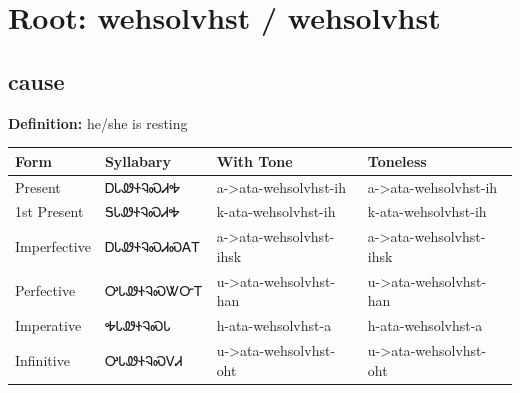 \documentclass{article}%
\begin{document}
%
\normalsize%
\section*{Root: wehsolvhst / wehsolvhst}%
\subsection*{cause}%
\textbf{Definition: }%
he/she is resting%
\\[0.5em]%
\begin{tabular}{|l|l|l|l|}%
\hline%
\textbf{Form}&\textbf{Syllabary}&\textbf{With Tone}&\textbf{Toneless}\\%
\hline%
Present&ᎠᏓᏪᏐᎸᏍᏗᎭ&a{-}>ata{-}wehsolvhst{-}ih&a{-}>ata{-}wehsolvhst{-}ih\\%
1st Present&ᎦᏓᏪᏐᎸᏍᏗᎭ&k{-}ata{-}wehsolvhst{-}ih&k{-}ata{-}wehsolvhst{-}ih\\%
Imperfective&ᎠᏓᏪᏐᎸᏍᏗᏍᎪᎢ&a{-}>ata{-}wehsolvhst{-}ihsk&a{-}>ata{-}wehsolvhst{-}ihsk\\%
Perfective&ᎤᏓᏪᏐᎸᏍᏔᏅᎢ&u{-}>ata{-}wehsolvhst{-}han&u{-}>ata{-}wehsolvhst{-}han\\%
Imperative&ᎭᏓᏪᏐᎸᏍᏓ&h{-}ata{-}wehsolvhst{-}a&h{-}ata{-}wehsolvhst{-}a\\%
Infinitive&ᎤᏓᏪᏐᎸᏍᏙᏗ&u{-}>ata{-}wehsolvhst{-}oht&u{-}>ata{-}wehsolvhst{-}oht\\%
\hline%
\end{tabular}%
\\[1em]%
\end{document}
